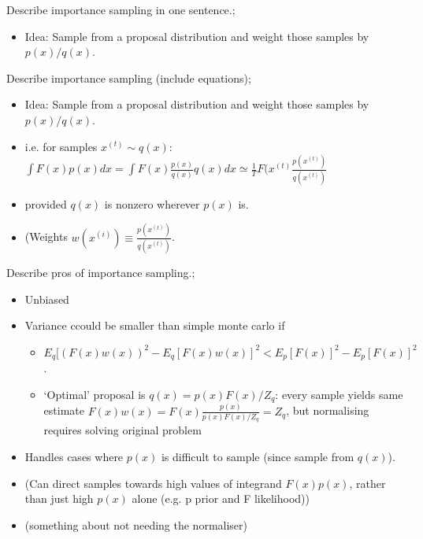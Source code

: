 \documentclass{article}
\begin{document}
Describe importance sampling in one sentence.; \begin{itemize} \item Idea: Sample from a proposal distribution and weight those samples by $p(x)/q(x)$. \end{itemize}

Describe importance sampling (include equations); \begin{itemize} \item Idea: Sample from a proposal distribution and weight those samples by $p(x)/q(x)$. \item i.e. for samples $x^{(t)}\sim q(x)$: $\int F(x)p(x)dx = \int F(x)\frac{p(x)}{q(x)}q(x) dx \simeq \frac{1}{T}F(x^{(t)}\frac{p(x^{(t)})}{q(x^{(t)})}$ \item provided $q(x)$ is nonzero wherever $p(x)$ is.  \item (Weights $w(x^{(i)}) \equiv \frac{p(x^{(t)})}{q(x^{(t)})}$. \end{itemize}

Describe pros of importance sampling.; \begin{itemize} \item Unbiased \item Variance ccould be smaller than simple monte carlo if  \begin{itemize} \item $E_q[(F(x)w(x))^2 - E_q [F(x)w(x)]^2 < E_p [F(x)]^2 - E_p [F(x)]^2$. \item `Optimal' proposal is $q(x) = p(x)F(x)/Z_q$: every sample yields same estimate $F(x)w(x) = F(x)\frac{p(x)}{p(x)F(x)/Z_q}=Z_q$, but normalising requires solving original problem \end{itemize} \item Handles cases where $p(x)$ is difficult to sample (since sample from $q(x)$). \item (Can direct samples towards high values of integrand $F(x)p(x)$, rather than just high $p(x)$ alone (e.g. p prior and F likelihood)) \item (something about not needing the normaliser) \end{itemize}
\end{document}
